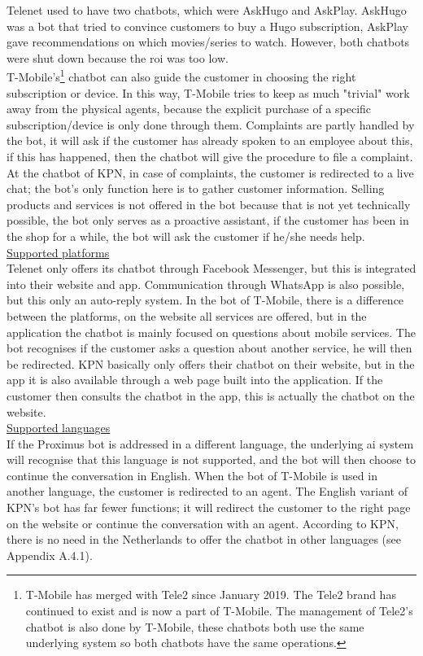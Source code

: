 \break
Telenet used to have two chatbots, which were AskHugo and AskPlay. AskHugo was a bot that tried to convince customers to buy a Hugo subscription, AskPlay gave recommendations on which movies/series to watch. However, both chatbots were shut down because the \acrshort{roi} was too low.\\
\break
T-Mobile's\footnote{T-Mobile has merged with Tele2 since January 2019. The Tele2 brand has continued to exist and is now a part of T-Mobile. The management of Tele2's chatbot is also done by T-Mobile, these chatbots both use the same underlying system so both chatbots have the same operations.} chatbot can also guide the customer in choosing the right subscription or device. In this way, T-Mobile tries to keep as much "trivial" work away from the physical agents, because the explicit purchase of a specific subscription/device is only done through them. Complaints are partly handled by the bot, it will ask if the customer has already spoken to an employee about this, if this has happened, then the chatbot will give the procedure to file a complaint.\\
\break
At the chatbot of KPN, in case of complaints, the customer is redirected to a live chat; the bot's only function here is to gather customer information. Selling products and services is not offered in the bot because that is not yet technically possible, the bot only serves as a proactive assistant, if the customer has been in the shop for a while, the bot will ask the customer if he/she needs help.\\
\break
\ul{Supported platforms}\\
Telenet only offers its chatbot through Facebook Messenger, but this is integrated into their website and app. Communication through WhatsApp is also possible, but this only an auto-reply system. In the bot of T-Mobile, there is a difference between the platforms, on the website all services are offered, but in the application the chatbot is mainly focused on questions about mobile services. The bot recognises if the customer asks a question about another service, he will then be redirected. KPN basically only offers their chatbot on their website, but in the app it is also available through a web page built into the application. If the customer then consults the chatbot in the app, this is actually the chatbot on the website.\\
\break
\ul{Supported languages}\\
If the Proximus bot is addressed in a different language, the underlying \acrshort{ai} system will recognise that this language is not supported, and the bot will then choose to continue the conversation in English. When the bot of T-Mobile is used in another language, the customer is redirected to an agent. The English variant of KPN's bot has far fewer functions; it will redirect the customer to the right page on the website or continue the conversation with an agent. According to KPN, there is no need in the Netherlands to offer the chatbot in other languages (see Appendix A.4.1). \\
